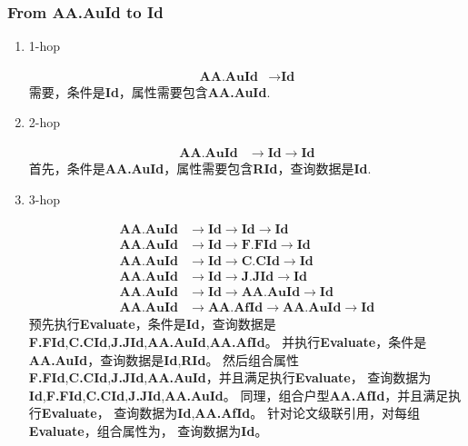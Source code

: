 \documentclass[hyperref,UTF8]{ctexart}
\theoremstyle{definition}
\theoremstyle{remark}
\numberwithin{equation}{subsection}
\newcommand{\Emph}{\textbf}
\newcommand{\Evaluate}{\Emph{Evaluate}}
\newcommand{\Id}{\Emph{Id}}
\newcommand{\RId}{\Emph{RId}}
\newcommand{\FFId}{\Emph{F.FId}}
\newcommand{\CCId}{\Emph{C.CId}}
\newcommand{\JJId}{\Emph{J.JId}}
\newcommand{\AAAuId}{\Emph{AA.AuId}}
\newcommand{\AAAfId}{\Emph{AA.AfId}}
\begin{document}
\subsubsection{From \Emph{AA.AuId} to \Emph{Id}}
\label{subsub:AAAuId2Id}

	\begin{enumerate}[(1)]
		
		\item 1-hop
		
		\begin{align}
			\AAAuId &\rightarrow \Id	\label{equ:auid-id}
		\end{align}
		需要，条件是\Id，属性需要包含\AAAuId.
		
		\item 2-hop
		
		\begin{align}
			\AAAuId &\rightarrow \Id \rightarrow \Id	\label{equ:auid-id-id}
		\end{align}
		首先，条件是\AAAuId，属性需要包含\RId，查询数据是\Id.
		
		\item 3-hop
		
		\begin{align}
			\AAAuId &\rightarrow \Id \rightarrow \Id \rightarrow \Id		\label{equ:auid-id-id-id}	\\
			\AAAuId &\rightarrow \Id \rightarrow \FFId \rightarrow \Id		\label{equ:auid-id-fid-id}	\\
			\AAAuId &\rightarrow \Id \rightarrow \CCId \rightarrow \Id		\label{equ:auid-id-cid-id}	\\
			\AAAuId &\rightarrow \Id \rightarrow \JJId \rightarrow \Id		\label{equ:auid-id-jid-id}	\\
			\AAAuId &\rightarrow \Id \rightarrow \AAAuId \rightarrow \Id	\label{equ:auid-id-auid-id}	\\
			\AAAuId &\rightarrow \AAAfId \rightarrow \AAAuId \rightarrow \Id \label{equ:auid-afid-auid-id}
		\end{align}
		预先执行\Evaluate，条件是\Id，查询数据是\FFId,\CCId,\JJId,\AAAuId,\AAAfId。
		并执行\Evaluate，条件是\AAAuId，查询数据是\Id,\RId。
		然后组合属性\FFId,\CCId,\JJId,\AAAuId，并且满足执行\Evaluate，
		查询数据为\Id,\FFId,\CCId,\JJId,\AAAuId。
		同理，组合户型\AAAfId，并且满足执行\Evaluate，
		查询数据为\Id,\AAAfId。
		针对论文级联引用，对每组\Evaluate，组合属性为，
		查询数据为\Id。
		
	\end{enumerate}
	
\end{document}
